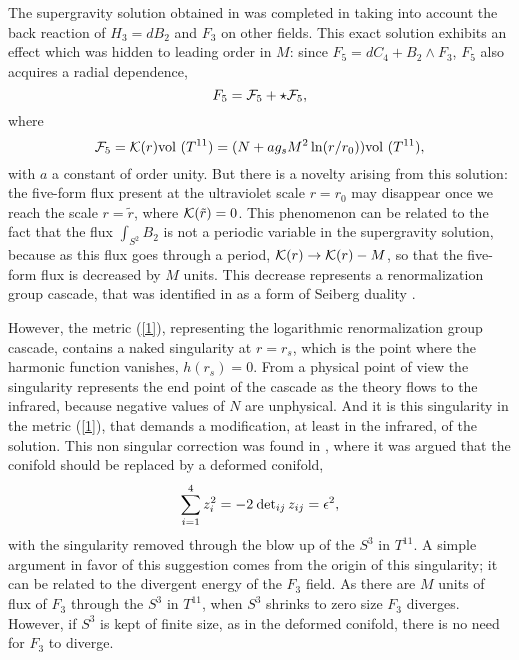 \documentclass[12pt,epsf,a4paper]{article}
\begin{document}
The supergravity solution obtained in \cite{KN} was completed in \cite{KT} taking into 
account the back reaction of $H_3 = dB_2$ and $F_3$ on other fields. This exact solution 
exhibits an effect which was hidden to leading order in $M$: since 
$F_5 = dC_4 +B_2 \wedge F_3$, $F_5$ also acquires a radial dependence,
\begin{equation}
F_5 = {\cal F}_5 + \star {\cal F}_5,
\label{5}
\end{equation}
where 
\begin{equation}
{\cal F}_5 = {\cal K}(r)  \hbox{vol }(T^{11}) = 
(N + a g_s M^2 \ln (r/r_0)) \hbox{vol }(T^{11}),
\label{6}
\end{equation}
with $a$ a constant of order unity. But there is a novelty arising from this 
solution: the five-form flux present at the  
ultraviolet scale $r=r_0$ may disappear once we reach the scale $r=\tilde{r}$, where 
${\cal K}(\tilde{r})=0$. This phenomenon can be related to the fact that the flux 
$\int_{S^2} B_2$ is not a periodic variable in the supergravity solution, because as 
this flux goes through a period, ${\cal K}(r) \rightarrow {\cal K}(r) -M$, so that 
the five-form flux is decreased by $M$ units. This decrease represents a renormalization 
group cascade, that was identified in \cite{KS} as a form of Seiberg duality \cite{Seiberg}.
  
However, the metric (\ref{1}), representing the logarithmic renormalization group cascade, contains 
a naked singularity at $r=r_s$, which is the point where the harmonic function vanishes, $h(r_s)=0$. 
From a physical point of view the singularity represents the end point of the cascade as 
the theory flows to the infrared, because negative values of $N$ are unphysical. And it is this 
singularity in the metric (\ref{1}), that  demands a 
modification, at least in the 
infrared, of the solution. This non singular correction was found in \cite{KS}, where 
it was argued that the conifold should be replaced by a deformed conifold, 
\begin{equation}
\sum_{i=1}^4 z_i^2 = - 2 \: \hbox{det}_{ij} \, z_{ij} = \epsilon^2,
\label{7}
\end{equation}
with the singularity removed through the blow up of the $S^3$ in $T^{11}$. A simple argument 
in favor of this suggestion comes from the origin of this singularity; it 
can be related to the divergent energy of the $F_3$ field. As there are $M$ units of 
flux of $F_3$ through the $S^3$ in $T^{11}$, when $S^3$ shrinks to zero size $F_3$ 
diverges. However, if $S^3$ is kept of finite size, as in the deformed conifold, there is 
no need for $F_3$ to diverge.
  
\end{document}
